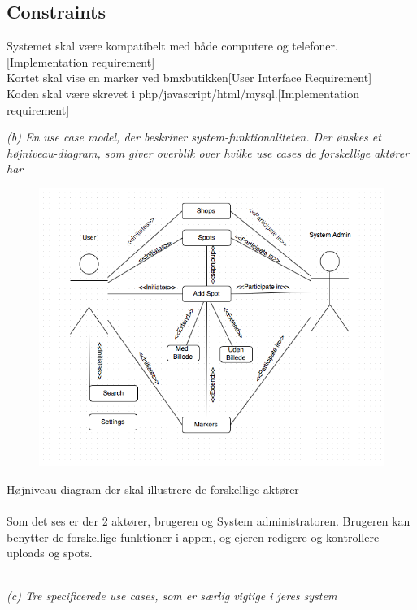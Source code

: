 \documentclass[12pt]{article}
\begin{document}
\subsection*{Constraints}
Systemet skal være kompatibelt med både computere og telefoner.[Implementation requirement]\\
Kortet skal vise en marker ved bmxbutikken[User Interface Requirement]\\
Koden skal være skrevet i php/javascript/html/mysql.[Implementation requirement]\\

\pagebreak

\textit{(b) En use case model, der beskriver system-funktionaliteten. Der ønskes et højniveau-diagram,
som giver overblik over hvilke use cases de forskellige aktører har}\\
\begin{figure}[htb]
\includegraphics[scale = 0.75]{UM}
\end{figure}

Højniveau diagram der skal illustrere de forskellige aktører\\\\
Som det ses er der 2 aktører, brugeren og System administratoren. Brugeren kan benytter de forskellige funktioner i appen, og ejeren redigere og kontrollere uploads og spots. 

\pagebreak\\
\textit{(c) Tre specificerede use cases, som er særlig vigtige i jeres system}\\
\setlength\parindent{0pt}
\end{document}
